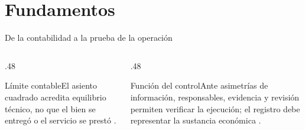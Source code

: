 \documentclass[spanish,aspectratio=169,xcolor={dvipsnames,table}]{beamer}
\begin{document}
\section{Fundamentos}
\begin{frame}{De la contabilidad a la prueba de la operación}
  \begin{center}
  \end{center}
  \vfill
  \begin{columns}[T]
    \begin{column}{.48\textwidth}
      \begin{block}{Límite contable}\small El asiento cuadrado acredita equilibrio técnico, no que el bien se entregó o el servicio se prestó \parencite[cap. 3]{openstax2019}.\end{block}
    \end{column}
    \begin{column}{.48\textwidth}
      \begin{block}{Función del control}\small Ante asimetrías de información, responsables, evidencia y revisión permiten verificar la ejecución; el registro debe representar la sustancia económica \parencite[cap. 2]{ifrs2018}.\end{block}
    \end{column}
  \end{columns}
\end{frame}
\end{document}
